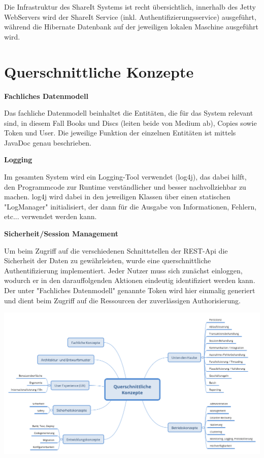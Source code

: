 \documentclass[]{article}
\begin{document}
Die Infrastruktur des ShareIt Systems ist recht übersichtlich, innerhalb des Jetty WebServers wird der ShareIt Service (inkl. Authentifizierungsservice) ausgeführt, während die Hibernate Datenbank auf der jeweiligen lokalen Maschine ausgeführt wird.



\section{Querschnittliche Konzepte}\label{section-concepts}



\textbf{Fachliches Datenmodell}

Das fachliche Datenmodell beinhaltet die Entitäten, die für das System relevant sind, in diesem Fall Books und Discs (leiten beide von Medium ab), Copies sowie Token und User. Die jeweilige Funktion der einzelnen Entitäten ist mittels JavaDoc genau beschrieben.

\textbf{Logging}

Im gesamten System wird ein Logging-Tool verwendet (log4j), das dabei hilft, den Programmcode zur Runtime verständlicher und besser nachvollziehbar zu machen. log4j wird dabei in den jeweiligen Klassen über einen statischen "LogManager" initialisiert, der dann für die Ausgabe von Informationen, Fehlern, etc... verwendet werden kann.


\textbf{Sicherheit/Session Management}

Um beim Zugriff auf die verschiedenen Schnittstellen der REST-Api die Sicherheit der Daten zu gewährleisten, wurde eine querschnittliche Authentifizierung implementiert. Jeder Nutzer muss sich zunächst einloggen, wodurch er in den darauffolgenden Aktionen eindeutig identifiziert werden kann. Der unter "Fachliches Datenmodell" genannte Token wird hier einmalig generiert und dient beim Zugriff auf die Ressourcen der zuverlässigen Authorisierung.



\includegraphics{images/08-Crosscutting-Concepts-Structure-DE.png}
\end{document}
